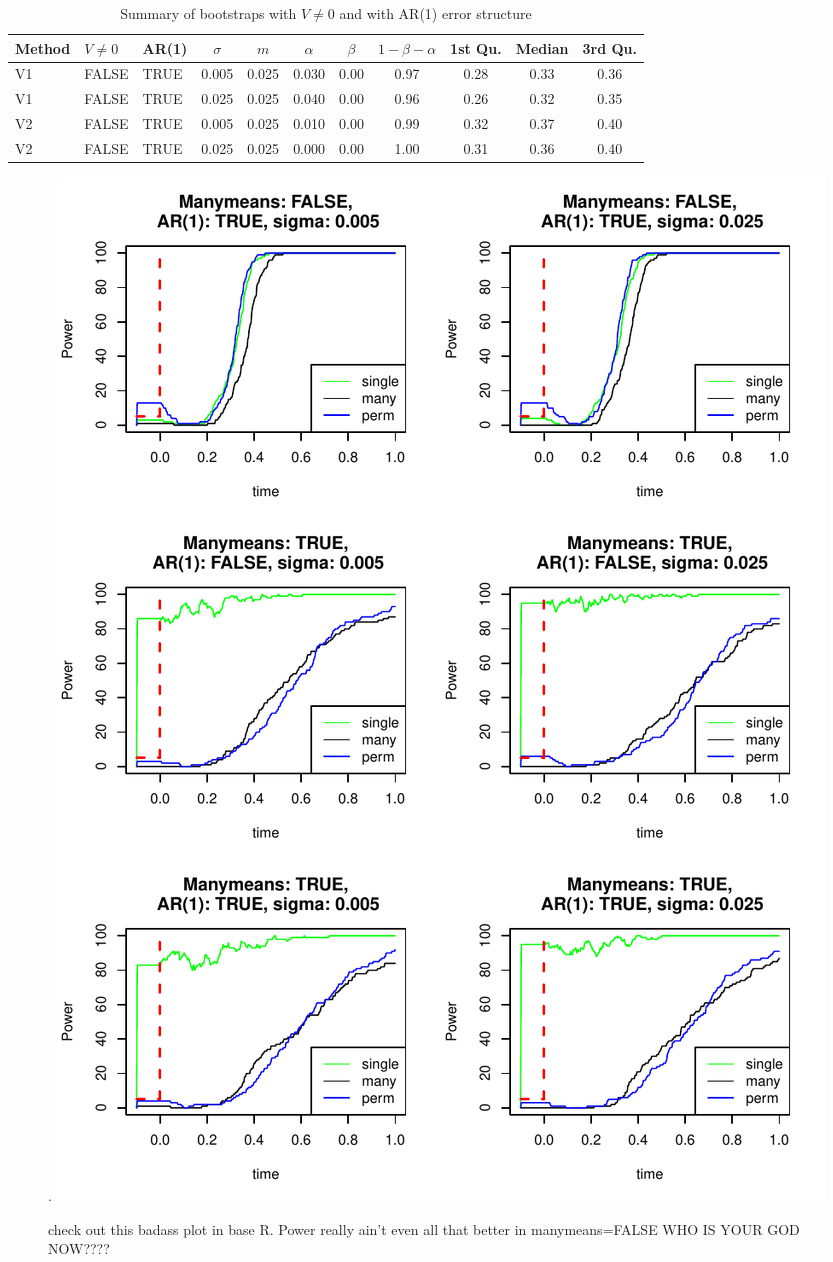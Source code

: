 \documentclass{article}
\begin{document}
\begin{table}[H]
\centering
\begin{tabular}{lllcccccccc}
  \hline
Method & $V \not= 0$ & AR(1) & $\sigma$ & $m$ & $\alpha$ & $\beta$ & $1 - \beta - \alpha$  & 1st Qu. & Median & 3rd Qu.  \\ 
  \hline
V1 & FALSE & TRUE & 0.005 & 0.025 & 0.030 & 0.00 & 0.97 & 0.28 & 0.33 & 0.36 \\ 
  V1 & FALSE & TRUE & 0.025 & 0.025 & 0.040 & 0.00 & 0.96 & 0.26 & 0.32 & 0.35 \\ 
  V2 & FALSE & TRUE & 0.005 & 0.025 & 0.010 & 0.00 & 0.99 & 0.32 & 0.37 & 0.40 \\ 
  V2 & FALSE & TRUE & 0.025 & 0.025 & 0.000 & 0.00 & 1.00 & 0.31 & 0.36 & 0.40 \\ 
   \hline
\end{tabular}
\caption{Summary of bootstraps with $V \not=0$ and with AR(1) error structure}
\label{tab:best_case}
\end{table}


\begin{figure}
\centering.
\includegraphics{type_two_err_time_slice.pdf}
\caption{check out this badass plot in base R. Power really ain't even all that better in manymeans=FALSE WHO IS YOUR GOD NOW????}
\end{figure}
\end{document}
